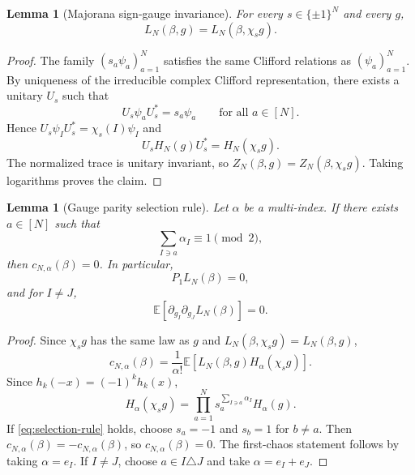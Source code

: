 \documentclass[11pt]{article}
\newtheorem{lemma}[theorem]{Lemma}
\newcommand{\E}{\mathbb{E}}
\begin{document}
\begin{lemma}[Majorana sign-gauge invariance]\label{lem:gauge-invariance}
  For every $s\in\{\pm1\}^N$ and every $g$,
  \begin{equation}\label{eq:gauge-invariance}
    L_N(\beta,g)=L_N(\beta,\chi_sg).
  \end{equation}
\end{lemma}

\begin{proof}
  The family $(s_a\psi_a)_{a=1}^N$ satisfies the same Clifford relations as
  $(\psi_a)_{a=1}^N$.  By uniqueness of the irreducible complex Clifford
  representation, there exists a unitary $U_s$ such that
  \begin{equation}\label{eq:unitary-sign-flip}
    U_s\psi_aU_s^*=s_a\psi_a
    \qquad
    \text{for all }a\in[N].
  \end{equation}
  Hence $U_s\psi_IU_s^*=\chi_s(I)\psi_I$ and
  \begin{equation}\label{eq:H-gauge}
    U_sH_N(g)U_s^*=H_N(\chi_sg).
  \end{equation}
  The normalized trace is unitary invariant, so $Z_N(\beta,g)=Z_N(\beta,\chi_sg)$.
  Taking logarithms proves the claim.
\end{proof}

\begin{lemma}[Gauge parity selection rule]\label{lem:selection}
  Let $\alpha$ be a multi-index.  If there exists $a\in[N]$ such that
  \begin{equation}\label{eq:selection-rule}
    \sum_{I\ni a}\alpha_I\equiv1\pmod2,
  \end{equation}
  then $c_{N,\alpha}(\beta)=0$.  In particular,
  \begin{equation}\label{eq:first-chaos-zero}
    P_1L_N(\beta)=0,
  \end{equation}
  and for $I\neq J$,
  \begin{equation}\label{eq:off-diag-second-zero}
    \E[\partial_{g_I}\partial_{g_J}L_N(\beta)]=0.
  \end{equation}
\end{lemma}

\begin{proof}
  Since $\chi_sg$ has the same law as $g$ and $L_N(\beta,\chi_sg)=L_N(\beta,g)$,
  \begin{equation}\label{eq:coeff-gauge}
    c_{N,\alpha}(\beta)
    =
    \frac1{\alpha!}\E[L_N(\beta,g)H_\alpha(\chi_sg)].
  \end{equation}
  Since $h_k(-x)=(-1)^kh_k(x)$,
  \begin{equation}\label{eq:Hermite-sign}
    H_\alpha(\chi_sg)
    =
    \prod_{a=1}^N s_a^{\sum_{I\ni a}\alpha_I}H_\alpha(g).
  \end{equation}
  If \eqref{eq:selection-rule} holds, choose $s_a=-1$ and $s_b=1$ for
  $b\neq a$.  Then $c_{N,\alpha}(\beta)=-c_{N,\alpha}(\beta)$, so
  $c_{N,\alpha}(\beta)=0$.  The first-chaos statement follows by taking
  $\alpha=e_I$.  If $I\neq J$, choose $a\in I\triangle J$ and take
  $\alpha=e_I+e_J$.
\end{proof}
\end{document}
